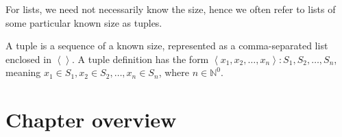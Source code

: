 For lists, we need not necessarily know the size, hence we often refer to lists
of some particular known size as tuples.

\begin{definition} A tuple is a sequence of a known size, represented as a
comma-separated list enclosed in $\left\langle \right\rangle$. A tuple
definition has the form $\left\langle x_1,x_2,\ldots,x_n \right\rangle : S_1,
S_2, \ldots, S_n$, meaning $x_1\in S_1, x_2\in S_2, \ldots, x_n\in S_n$, where
$n\in\mathbb{N}^0$.\end{definition}

\section{Chapter overview}

\begin{description}[\setleftmargin{70pt}\setlabelstyle{\bf}]

\item [Chapter 2]

\item [Chapter 3]

\item [Chapter 4]

\item [Chapter 5]

\end{description}
